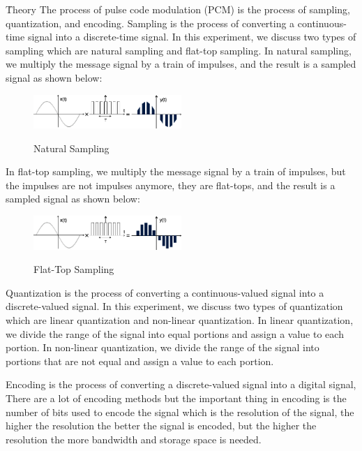 \documentclass[12pt]{article}
\begin{document}
\tableofcontents
\clearpage
\setlength{\parskip}{\baselineskip}%
\listoffigures
\clearpage
{}
\h{Theory}
The process of pulse code modulation (PCM) is the process of sampling, quantization, and encoding. 
Sampling is the process of converting a continuous-time signal into a discrete-time signal. In this experiment, we discuss two types of sampling which are natural sampling and flat-top sampling. 
In natural sampling, we multiply the message signal by a train of impulses, and the result is a sampled signal as shown below:
\begin{figure}[H]
    \centering
    \includegraphics[width=0.5\textwidth]{assets/natural_sampling.png}
    \caption{Natural Sampling}
    \label{fig:1}
    \cite{tutorialspoint}
\end{figure}

In flat-top sampling, we multiply the message signal by a train of impulses, but the impulses are not impulses anymore, they are flat-tops, and the result is a sampled signal as shown below:
\begin{figure}[H]
    \centering
    \includegraphics[width=0.5\textwidth]{assets/flat_top_sampling.png}
    \caption{Flat-Top Sampling}
    \label{fig:2}
    \cite{tutorialspoint}
\end{figure}
Quantization is the process of converting a continuous-valued signal into a discrete-valued signal. In this experiment, we discuss two types of quantization which are linear quantization and non-linear quantization.
In linear quantization, we divide the range of the signal into equal portions and assign a value to each portion.
In non-linear quantization, we divide the range of the signal into portions that are not equal and assign a value to each portion.

Encoding is the process of converting a discrete-valued signal into a digital signal, There are a lot of encoding methods but the important thing in encoding is the number of bits used to encode the signal which is the resolution of the signal, the higher the resolution the better the signal is encoded, but the higher the resolution the more bandwidth and storage space is needed.
\end{document}
